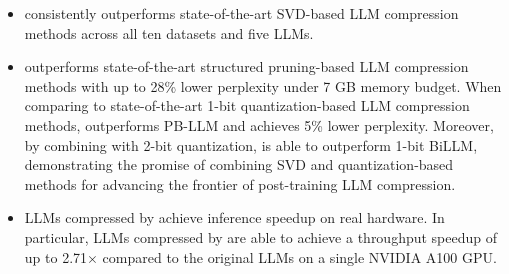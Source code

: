 \vspace{-2mm}
\begin{itemize}
    \item \sysname consistently outperforms state-of-the-art SVD-based LLM compression methods across all ten datasets and five LLMs.
    \vspace{-2mm}
    \item  \sysname outperforms state-of-the-art structured pruning-based LLM compression methods with up to 28\% lower perplexity under 7 GB memory budget. 
    When comparing to state-of-the-art 1-bit quantization-based LLM compression methods, \sysname outperforms PB-LLM and achieves 5\% lower perplexity. 
    Moreover, by combining with 2-bit quantization, \sysname is able to outperform 1-bit BiLLM, demonstrating the promise of combining SVD and quantization-based methods for advancing the frontier of post-training LLM compression.
    \vspace{-2mm}
    \item LLMs compressed by \sysname achieve inference speedup on real hardware. In particular, LLMs compressed by \sysname are able to achieve a throughput speedup of up to 2.71$\times$ compared to the original LLMs on a single NVIDIA A100 GPU.
\end{itemize}
